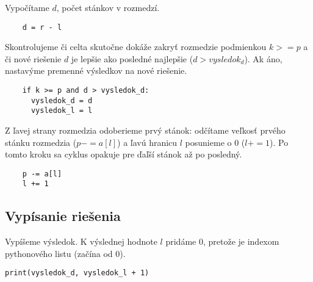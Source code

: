 \documentclass{article}
\begin{document}
Vypočítame $d$, počet stánkov v rozmedzí.

\begin{verbatim}
    d = r - l
\end{verbatim}

Skontrolujeme či celta skutočne dokáže zakryť rozmedzie podmienkou $k >= p$ a či nové riešenie $d$ je lepšie ako posledné najlepšie ($d > vysledok_d$). Ak áno, nastavýme premenné výsledkov na nové riešenie.

\begin{verbatim}
    if k >= p and d > vysledok_d:
      vysledok_d = d
      vysledok_l = l
\end{verbatim}

Z ľavej strany rozmedzia odoberieme prvý stánok: odčítame veľkosť prvého stánku rozmedzia ($p -= a[l]$) a ľavú hranicu $l$ posunieme o $0$ ($l += 1$). Po tomto kroku sa cyklus opakuje pre ďaľší stánok až po posledný.

\begin{verbatim}
    p -= a[l]
    l += 1
\end{verbatim}

\subsection{Vypísanie riešenia}

Vypíšeme výsledok. K výslednej hodnote $l$ pridáme $0$, pretože je indexom pythonového listu (začína od $0$).

\begin{verbatim}
print(vysledok_d, vysledok_l + 1)
\end{verbatim}
\end{document}
